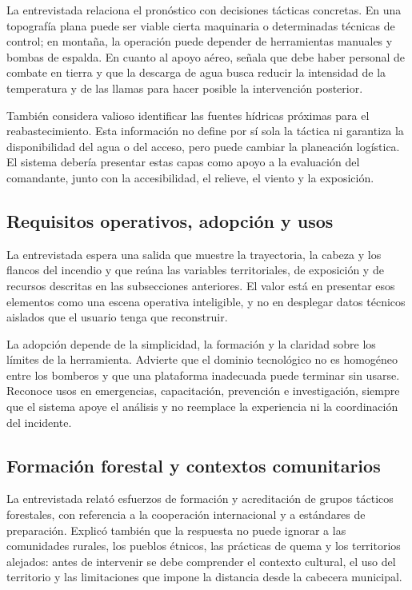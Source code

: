 La entrevistada relaciona el pronóstico con decisiones tácticas concretas. En una topografía plana puede ser viable cierta maquinaria o determinadas técnicas de control; en montaña, la operación puede depender de herramientas manuales y bombas de espalda. En cuanto al apoyo aéreo, señala que debe haber personal de combate en tierra y que la descarga de agua busca reducir la intensidad de la temperatura y de las llamas para hacer posible la intervención posterior.

También considera valioso identificar las fuentes hídricas próximas para el reabastecimiento. Esta información no define por sí sola la táctica ni garantiza la disponibilidad del agua o del acceso, pero puede cambiar la planeación logística. El sistema debería presentar estas capas como apoyo a la evaluación del comandante, junto con la accesibilidad, el relieve, el viento y la exposición.

\subsection{Requisitos operativos, adopción y usos}

La entrevistada espera una salida que muestre la trayectoria, la cabeza y los flancos del incendio y que reúna las variables territoriales, de exposición y de recursos descritas en las subsecciones anteriores. El valor está en presentar esos elementos como una escena operativa inteligible, y no en desplegar datos técnicos aislados que el usuario tenga que reconstruir.

La adopción depende de la simplicidad, la formación y la claridad sobre los límites de la herramienta. Advierte que el dominio tecnológico no es homogéneo entre los bomberos y que una plataforma inadecuada puede terminar sin usarse. Reconoce usos en emergencias, capacitación, prevención e investigación, siempre que el sistema apoye el análisis y no reemplace la experiencia ni la coordinación del incidente.

\subsection{Formación forestal y contextos comunitarios}

La entrevistada relató esfuerzos de formación y acreditación de grupos tácticos forestales, con referencia a la cooperación internacional y a estándares de preparación. Explicó también que la respuesta no puede ignorar a las comunidades rurales, los pueblos étnicos, las prácticas de quema y los territorios alejados: antes de intervenir se debe comprender el contexto cultural, el uso del territorio y las limitaciones que impone la distancia desde la cabecera municipal.

